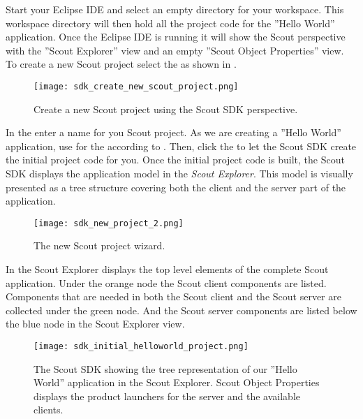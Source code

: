 %

Start your Eclipse IDE and select an empty directory for your workspace. 
This workspace directory will then hold all the project code for the ''Hello World'' application. 
Once the Eclipse IDE is running it will show the Scout perspective with the ''Scout Explorer'' view and an empty ''Scout Object Properties'' view.
To create a new Scout project select the  as shown in .

\begin{figure}
\texttt{[image: sdk\_create\_new\_scout\_project.png]}
\caption{Create a new Scout project using the Scout SDK perspective.}
\end{figure}

In the  enter a name for you Scout project. 
As we are creating a ''Hello World'' application, use  for the  according to .
Then, click the  to let the Scout SDK create the initial project code for you.
Once the initial project code is built, the Scout SDK displays the application model in the \textit{Scout Explorer}.
This model is visually presented as a tree structure covering both the client and the server part of the application.

\begin{figure}
\texttt{[image: sdk\_new\_project\_2.png]}
\caption{The new Scout project wizard.}
\end{figure}

In  the Scout Explorer displays the top level elements of the complete Scout application.
Under the orange node the Scout client components are listed. 
Components that are needed in both the Scout client and the Scout server are collected under the green node.
And the Scout server components are listed below the blue node in the Scout Explorer view.

\begin{figure}
\texttt{[image: sdk\_initial\_helloworld\_project.png]}
\caption{The Scout SDK showing the tree representation of our ''Hello World'' application in the Scout Explorer.
Scout Object Properties displays the product launchers for the server and the available clients.}
\end{figure}

